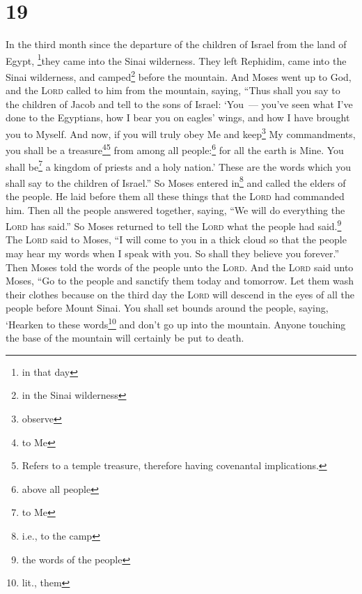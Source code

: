 \section{19}
\begin{enumerate}[align=center]
     In the third month since the departure of the children of Israel from the land of Egypt, \footnote{in that day}they came into the Sinai wilderness.%
     They left Rephidim, came into the Sinai wilderness, and camped\footnote{in the Sinai wilderness} before the mountain.%
     And Moses went up to God, and the \textsc{Lord} called to him from the mountain, saying, ``Thus shall you say to the children of Jacob and tell to the sons of Israel:%
     `You~--- you've seen what I've done to the Egyptians, how I bear you on eagles' wings, and how I have brought you to Myself.%
     And now, if you will truly obey Me and keep\footnote{observe} My commandments, you shall be a treasure\footnote{to Me}\footnote{Refers to a temple treasure, therefore having covenantal implications.} from among all people:\footnote{above all people} for all the earth is Mine.%
     You shall be\footnote{to Me} a kingdom of priests and a holy nation.' These are the words which you shall say to the children of Israel.''%
     So Moses entered in\footnote{i.e., to the camp} and called the elders of the people. He laid before them all these things that the \textsc{Lord} had commanded him.%
     Then all the people answered together, saying, ``We will do everything the \textsc{Lord} has said.'' So Moses returned to tell the \textsc{Lord} what the people had said.\footnote{the words of the people}%
     The \textsc{Lord} said to Moses, ``I will come to you in a thick cloud so that the people may hear my words when I speak with you. So shall they believe you forever.'' Then Moses told the words of the people unto the \textsc{Lord}.%
     And the \textsc{Lord} said unto Moses, ``Go to the people and sanctify them today and tomorrow. Let them wash their clothes%
     because on the third day the \textsc{Lord} will descend in the eyes of all the people before Mount Sinai.%
     You shall set bounds around the people, saying, `Hearken to these words\footnote{lit., them} and don't go up into the mountain. Anyone touching the base of the mountain will certainly be put to death.%

\end{enumerate}
